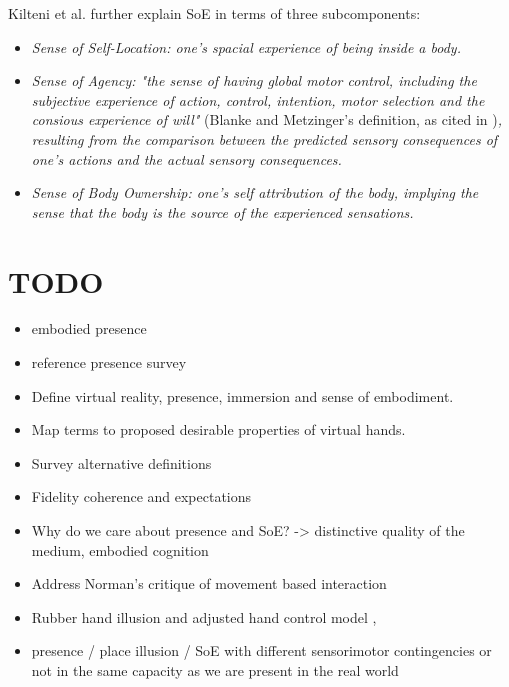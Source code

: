Kilteni et al. further explain SoE in terms of three subcomponents:

\begin{displayquote}
\begin{itemize}
\item \textit{Sense of Self-Location: one's spacial experience of being inside a body.}
\item \textit{Sense of Agency: "the sense of having global motor control, including the subjective experience of action, control, intention, motor selection and the consious experience of will"} (Blanke and Metzinger's definition, as cited in \parencite{Kilteni2012})\textit{, resulting from the comparison between the predicted sensory consequences of one's actions and the actual sensory consequences.}
\item \textit{Sense of Body Ownership: one's self attribution of the body, implying the sense that the body is the source of the experienced sensations.}
\end{itemize}
\end{displayquote}

\section{TODO}

\begin{itemize}
\item embodied presence \parencite{Schubert1999}
\item reference presence survey \parencite{Schuemie2001}
\item Define virtual reality, presence, immersion and sense of embodiment.
\item Map terms to proposed desirable properties of virtual hands.
\item Survey alternative definitions
\item Fidelity coherence and expectations \parencite{Nowak2003, Argelaguet2016}
\item Why do we care about presence and SoE? -> distinctive quality of the medium, embodied cognition
\item Address Norman's critique of movement based interaction \parencite{Gillies2016}
\item Rubber hand illusion and adjusted hand control model \parencite{Sanchez-Vives2010}, \parencite{Fourneret1998}
\item presence / place illusion / SoE with different sensorimotor contingencies or not in the same capacity as we are present in the real world
\end{itemize}